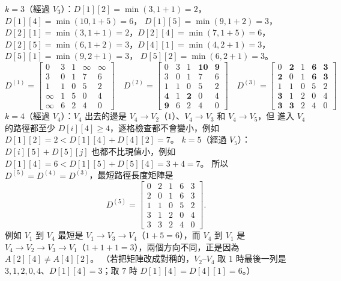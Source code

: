 \begin{pastsoln}
$k = 3$（經過 $V_3$）：$D[1][2] = \min(3, 1 + 1) = 2$，$D[1][4] = \min(10, 1 + 5) = 6$，
$D[1][5] = \min(9, 1 + 2) = 3$，$D[2][1] = \min(3, 1 + 1) = 2$，$D[2][4] = \min(7, 1 + 5) = 6$，
$D[2][5] = \min(6, 1 + 2) = 3$，$D[4][1] = \min(4, 2 + 1) = 3$，$D[5][1] = \min(9, 2 + 1) = 3$，
$D[5][2] = \min(6, 2 + 1) = 3$。
\[
D^{(1)} = \begin{bmatrix}
0 & 3 & 1 & \infty & \infty \\
3 & 0 & 1 & 7 & 6 \\
1 & 1 & 0 & 5 & 2 \\
\infty & 1 & 5 & 0 & 4 \\
\infty & 6 & 2 & 4 & 0
\end{bmatrix}
\quad
D^{(2)} = \begin{bmatrix}
0 & 3 & 1 & \mathbf{10} & \mathbf{9} \\
3 & 0 & 1 & 7 & 6 \\
1 & 1 & 0 & 5 & 2 \\
\mathbf{4} & 1 & \mathbf{2} & 0 & 4 \\
\mathbf{9} & 6 & 2 & 4 & 0
\end{bmatrix}
\quad
D^{(3)} = \begin{bmatrix}
0 & \mathbf{2} & 1 & \mathbf{6} & \mathbf{3} \\
\mathbf{2} & 0 & 1 & \mathbf{6} & \mathbf{3} \\
1 & 1 & 0 & 5 & 2 \\
\mathbf{3} & 1 & 2 & 0 & 4 \\
\mathbf{3} & \mathbf{3} & 2 & 4 & 0
\end{bmatrix}
\]
$k = 4$（經過 $V_4$）：$V_4$ 出去的邊是 $V_4 \to V_2$（$1$）、$V_4 \to V_3$ 和 $V_4 \to V_5$，但
進入 $V_4$ 的路徑都至少 $D[i][4] \ge 4$，逐格檢查都不會變小，例如 $D[1][2] = 2 < D[1][4] + D[4][2]
= 7$。 $k = 5$（經過 $V_5$）：$D[i][5] + D[5][j]$ 也都不比現值小，例如 $D[1][4] = 6 <
D[1][5] + D[5][4] = 3 + 4 = 7$。 所以 $D^{(5)} = D^{(4)} = D^{(3)}$，最短路徑長度矩陣是
\[
D^{(5)} = \begin{bmatrix}
0 & 2 & 1 & 6 & 3 \\
2 & 0 & 1 & 6 & 3 \\
1 & 1 & 0 & 5 & 2 \\
3 & 1 & 2 & 0 & 4 \\
3 & 3 & 2 & 4 & 0
\end{bmatrix}.
\]
例如 $V_1$ 到 $V_4$ 最短是 $V_1 \to V_3 \to V_4$（$1 + 5 = 6$），而 $V_4$ 到 $V_1$ 是
$V_4 \to V_2 \to V_3 \to V_1$（$1 + 1 + 1 = 3$），兩個方向不同，正是因為 $A[2][4] \ne A[4][2]$。
（若把矩陣改成對稱的，$V_2$--$V_4$ 取 $1$ 時最後一列是 $3, 1, 2, 0, 4$、$D[1][4] = 3$；取 $7$
時 $D[1][4] = D[4][1] = 6$。）


\end{pastsoln}
